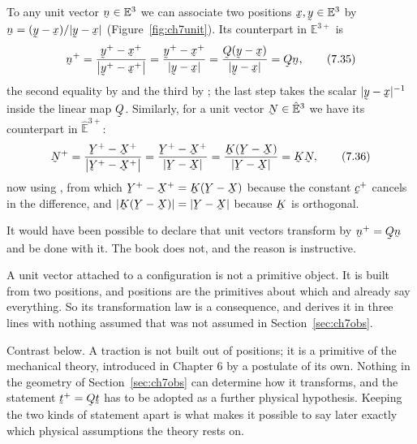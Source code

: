 To any unit vector $\bn\in\Et$ we can associate two positions
$\bx,\by\in\Et$ by $\bn=(\by-\bx)/|\by-\bx|$
(Figure~\ref{fig:ch7unit}). Its counterpart in $\mathbb{E}^{3+}$ is
\begin{equation}
   \bn^{+}=\frac{\by^{+}-\bx^{+}}{\big|\by^{+}-\bx^{+}\big|}
   =\frac{\by^{+}-\bx^{+}}{|\by-\bx|}
   =\frac{\bQ(\by-\bx)}{|\by-\bx|}
   =\bQ\bn ,
   \tag{7.35}\label{eq:7.35}
\end{equation}
the second equality by  and the third by ; the last
step takes the scalar $|\by-\bx|^{-1}$ inside the linear map $\bQ$.
Similarly, for a unit vector $\bN\in\hEt$ we have its counterpart in
$\hat{\mathbb{E}}^{3+}$:
\begin{equation}
   \bN^{+}=\frac{\bY^{+}-\bX^{+}}{\big|\bY^{+}-\bX^{+}\big|}
   =\frac{\bY^{+}-\bX^{+}}{|\bY-\bX|}
   =\frac{\bK(\bY-\bX)}{|\bY-\bX|}
   =\bK\bN ,
   \tag{7.36}\label{eq:7.36}
\end{equation}
now using , from which $\bY^{+}-\bX^{+}=\bK(\bY-\bX)$ because
the constant $\bc^{+}$ cancels in the difference, and
$|\bK(\bY-\bX)|=|\bY-\bX|$ because $\bK$ is orthogonal.

\begin{remark}\label{rem:ch7unitwhy}
It would have been possible to declare that unit vectors transform by
$\bn^{+}=\bQ\bn$ and be done with it. The book does not, and the reason
is instructive.

A unit vector attached to a configuration is not a primitive object. It
is built from two positions, and positions are the primitives about which
 and  already say everything. So its transformation law
is a consequence, and  derives it in three lines with nothing
assumed that was not assumed in Section~\ref{sec:ch7obs}.

Contrast  below. A traction is not built out of positions; it
is a primitive of the mechanical theory, introduced in Chapter 6 by a
postulate of its own. Nothing in the geometry of Section~\ref{sec:ch7obs}
can determine how it transforms, and the statement $\bt^{+}=\bQ\bt$ has
to be adopted as a further physical hypothesis. Keeping the two kinds of
statement apart is what makes it possible to say later exactly which
physical assumptions the theory rests on.
\end{remark}

